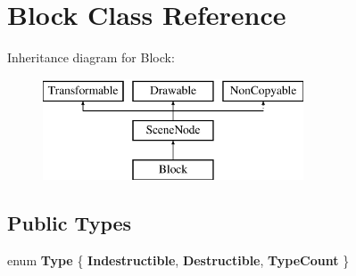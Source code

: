 \hypertarget{class_block}{}\section{Block Class Reference}
\label{class_block}
Inheritance diagram for Block\+:\begin{figure}[H]
\begin{center}
\leavevmode
\includegraphics[height=3.000000cm]{class_block}
\end{center}
\end{figure}
\subsection*{Public Types}
\begin{DoxyCompactItemize}
\item 
\hypertarget{class_block_a2c6b3c425b9b8cb708b23e553fa81324}{}enum {\bfseries Type} \{ {\bfseries Indestructible}, 
{\bfseries Destructible}, 
{\bfseries Type\+Count}
 \}\label{class_block_a2c6b3c425b9b8cb708b23e553fa81324}

\end{DoxyCompactItemize}

